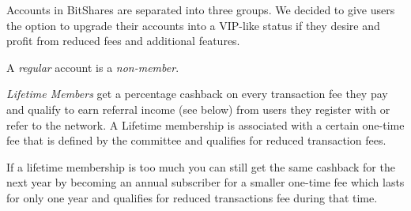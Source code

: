 Accounts in BitShares are separated into three groups. We decided to give users
the option to upgrade their accounts into a VIP-like status if they desire and
profit from reduced fees and additional features.

A \emph{regular} account is a \emph{non-member}.

\emph{Lifetime Members} get a percentage cashback on every transaction fee they
pay and qualify to earn referral income (see below) from users they register
with or refer to the network. A Lifetime membership is associated with a
certain one-time fee that is defined by the committee and qualifies for reduced
transaction fees.

If a lifetime membership is too much you can still get the same cashback for
the next year by becoming an annual subscriber for a smaller one-time fee which
lasts for only one year and qualifies for reduced transactions fee during that
time.

